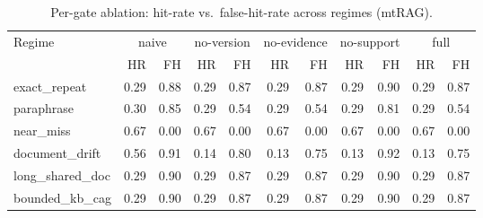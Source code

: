 \begin{table}[t]
\centering\small
\caption{Per-gate ablation: hit-rate vs.\ false-hit-rate across regimes (mtRAG).}
\label{tab:ablation}
\begin{tabular}{l rr rr rr rr rr }
\toprule
 Regime & \multicolumn{2}{c}{naive} & \multicolumn{2}{c}{no-version} & \multicolumn{2}{c}{no-evidence} & \multicolumn{2}{c}{no-support} & \multicolumn{2}{c}{full} \\
\cmidrule(lr){2-3}\cmidrule(lr){4-5}\cmidrule(lr){6-7}\cmidrule(lr){8-9}\cmidrule(lr){10-11}
 & HR & FH & HR & FH & HR & FH & HR & FH & HR & FH \\
\midrule
exact\_repeat & 0.29 & 0.88 & 0.29 & 0.87 & 0.29 & 0.87 & 0.29 & 0.90 & 0.29 & 0.87 \\
paraphrase & 0.30 & 0.85 & 0.29 & 0.54 & 0.29 & 0.54 & 0.29 & 0.81 & 0.29 & 0.54 \\
near\_miss & 0.67 & 0.00 & 0.67 & 0.00 & 0.67 & 0.00 & 0.67 & 0.00 & 0.67 & 0.00 \\
document\_drift & 0.56 & 0.91 & 0.14 & 0.80 & 0.13 & 0.75 & 0.13 & 0.92 & 0.13 & 0.75 \\
long\_shared\_doc & 0.29 & 0.90 & 0.29 & 0.87 & 0.29 & 0.87 & 0.29 & 0.90 & 0.29 & 0.87 \\
bounded\_kb\_cag & 0.29 & 0.90 & 0.29 & 0.87 & 0.29 & 0.87 & 0.29 & 0.90 & 0.29 & 0.87 \\
\bottomrule
\end{tabular}
\end{table}
